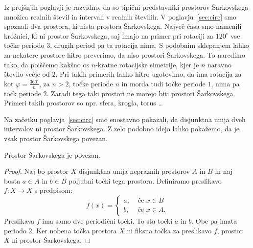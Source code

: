 \documentclass[../TG_magistrsko_delo_sections.tex]{subfiles}
\begin{document}
Iz prejšnjih poglavji je razvidno, da so tipični predstavniki prostorov Šarkovskega množica realnih števil in intervali v realnih številih. V poglavju~\ref{sec:circ} smo spoznali dva prostora, ki nista prostora Šarkovskega. Največ časa smo namenili krožnici, ki ni prostor Šarkovskega, saj imajo na primer pri rotaciji za $120^\circ$ vse točke periodo $3$, drugih period pa ta rotacija nima.
S podobnim sklepanjem lahko za nekatere prostore hitro preverimo, da niso prostori Šarkovskega. To naredimo tako, da poiščemo kakšno os $n$-kratne rotacijske simetrije, kjer je $n$ naravno število večje od $2$. Pri takih primerih lahko hitro ugotovimo, da ima rotacija za kot $\varphi = \frac{360^\circ}{n}$, za $n>2$, točke periode $n$ in morda tudi točke periode $1$, nima pa točk periode $2$. Zaradi tega taki prostori ne morejo biti prostori Šarkovskega. Primeri takih prostorov so npr. sfera, krogla, torus \dots 


Na začetku poglavja~\ref{sec:circ} smo enostavno pokazali, da disjunktna unija dveh intervalov ni prostor Šarkovskega. Z zelo podobno idejo lahko pokažemo, da je vsak prostor Šarkovskega povezan.


\begin{trditev}
Prostor Šarkovskega je povezan.
\end{trditev}
\begin{proof}
Naj bo prostor $X$ disjunktna unija nepraznih prostorov $A$ in $B$ in naj bosta $a \in A$ in $b \in B$ poljubni točki tega prostora. Definiramo preslikavo $f:X \to X$ s predpisom:
\[ f(x) = \begin{cases}
  a, & \mbox{ če $x \in B $}\\
  b ,& \mbox{ če $x \in A$.}
  \end{cases}
  \]
Preslikava $f$ ima samo dve periodični točki. To sta točki $a$ in $b$. Obe pa imata periodo 2. Ker nobena točka prostora $X$ ni fiksna točka za preslikavo $f$, prostor $X$ ni prostor Šarkovskega.
\end{proof}
\end{document}
